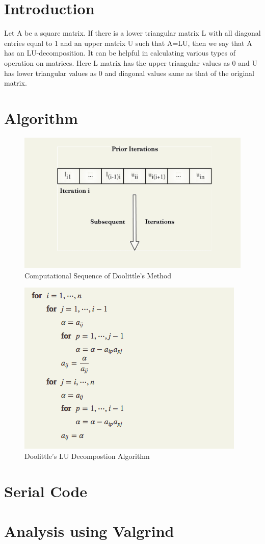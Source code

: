 \documentclass{sem5}
\author{Dilip Puri}
\begin{document}
\section{Introduction}
Let A be a square matrix. If there is a lower triangular matrix L with all diagonal entries equal to 1 and an upper matrix U such that A=LU, then we say that A has an LU-decomposition. It can be helpful in calculating various types of operation on matrices. Here L matrix has the upper triangular values as 0 and U has lower triangular values as 0 and diagonal values same as that of the original matrix. 

\section{Algorithm}
\begin{figure}[htbp]
\centering
\includegraphics[scale=.5]{1.png}
\caption{Computational Sequence of Doolittle's Method}
\end{figure}
\begin{figure}
\centering
\includegraphics[scale=.5]{2.png}
\caption{Doolittle's LU Decompostion Algorithm}
\end{figure}
\newpage
\section{Serial Code}

\section{Analysis using Valgrind}
\end{document}
